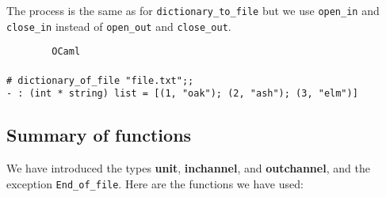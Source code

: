 \documentclass[]{book}
\newcommand{\smspace}{\vspace{4mm}}
\begin{document}
{\begin{sloppypar}
\noindent The process is the same as for \texttt{dictionary\_to\_file} but we use \texttt{open\_in} and \texttt{close\_in} instead of \texttt{open\_out} and \texttt{close\_out}.
\end{sloppypar}}

\smspace
\noindent\verb!        OCaml!\\
\noindent\\
\noindent\verb!# dictionary_of_file "file.txt";;!\\
\noindent\verb!- : (int * string) list = [(1, "oak"); (2, "ash"); (3, "elm")]!

\subsection*{Summary of functions}

We have introduced the types \textsf{\textbf{unit}}, \textsf{\textbf{in\raisebox{2pt}{\_}channel}}, and \textsf{\textbf{out\raisebox{2pt}{\_}channel}}, and the exception \texttt{End\_of\_file}. Here are the functions we have used:
\end{document}

